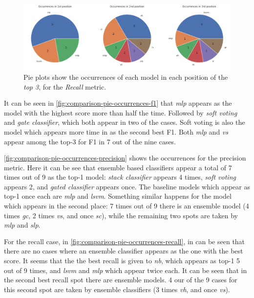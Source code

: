 \documentclass[epsfig,a4paper,11pt,titlepage,twoside,openany]{book}
\begin{document}
\begin{figure}[H]
  \centering \includegraphics[width=\textwidth]{comparison_recall_top_spaces_pies} 
  \caption{Pie plots show the occurrences of each model in each position of the \textit{top 3}, for the \textit{Recall} metric.}
  \label{fig:comparison-pie-occurrences-recall}
\end{figure}

It can be seen in \autoref{fig:comparison-pie-occurrences-f1} that \textit{mlp} appears as the model with the highest score more than half the time. Followed by \textit{soft voting} and \textit{gate classifier}, which both appear in two of the cases. Soft voting is also the model which appears more time in as the second best F1. Both \textit{mlp} and \textit{vs} appear among the top-3 for F1 in 7 out of the nine cases.

\autoref{fig:comparison-pie-occurrences-precision} shows the occurrences for the precision metric. Here it can be see that ensemble based classifiers appear a total of 7 times out of 9 as the top-1 model: \textit{stack classifier} appears 4 times, \textit{soft voting} appears 2, and \textit{gated classifier} appears once. The baseline models which appear as top-1 once each are \textit{mlp} and \textit{lsvm}. Something similar happens for the model which appears in the second place: 7 times out of 9 there is an ensemble model (4 times \textit{gc}, 2 times \textit{vs}, and once \textit{sc}), while the remaining two spots are taken by \textit{mlp} and \textit{slp}. 

For the recall case, in \autoref{fig:comparison-pie-occurrences-recall}, in can be seen that there are no cases where an ensemble classifier appears as the one with the best score. It seems that the the best recall is given to \textit{nb}, which appears as top-1 5 out of 9 times, and \textit{lsvm} and \textit{mlp} which appear twice each. It can be seen that in the second best recall spot there are ensemble models. 4 our of the 9 cases for this second spot are taken by ensemble classifiers (3 times \textit{vh}, and once \textit{vs}). 
\end{document}
